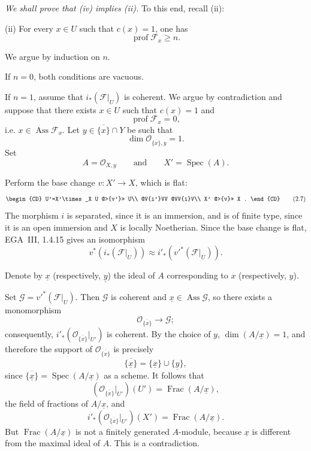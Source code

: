 \documentclass[11pt,a4paper,oneside]{book}
\providecommand{\cF}{\mathcal F}
\providecommand{\cG}{\mathcal G}
\providecommand{\cO}{\mathcal O}
\providecommand{\Ass}{\operatorname{Ass}}
\providecommand{\Spec}{\operatorname{Spec}}
\providecommand{\Frac}{\operatorname{Frac}}
\providecommand{\prof}{\operatorname{prof}}
\theoremstyle{plain}
\theoremstyle{definition}
\theoremstyle{remark}
\begin{document}
\medskip
\noindent\textit{We shall prove that \textup{(iv)} implies
\textup{(ii)}.} To this end, recall \textup{(ii)}:

\medskip
\noindent\textup{(ii)} For every $x\in U$ such that $c(x)=1$, one has
\[
  \operatorname{prof}\cF_x\geq n.
\]

\noindent We argue by induction on $n$.

\medskip
\noindent If $n=0$, both conditions are vacuous.


\medskip
\noindent If $n=1$, assume that $i_*(\cF|_U)$ is coherent. We argue by
contradiction and suppose that there exists $x\in U$ such that $c(x)=1$ and
\[
  \prof\cF_x=0,
\]
i.e. $x\in\Ass\cF_x$. Let $y\in\overline{\{x\}}\cap Y$ be such that
\[
  \dim\cO_{\overline{\{x\}},y}=1.
\]
Set
\[
  A=\cO_{X,y}\qquad\text{and}\qquad X'=\Spec(A).
\]

\setcounter{equation}{6}
\noindent Perform the base change $v\colon X'\longrightarrow X$, which is
flat:
\begin{equation}
\begin{CD}
U'=X'\times_X U @>{v'}>> U\\
@V{i'}VV @VV{i}V\\
X' @>{v}>> X .
\end{CD}
\tag{2.7}\label{eq:VIII.2.7}
\end{equation}
The morphism $i$ is separated, since it is an immersion, and is of finite
type, since it is an open immersion and $X$ is locally Noetherian. Since the
base change is flat, EGA~III, 1.4.15 gives an isomorphism
\begin{equation}
  v^*(i_*(\cF|_U))
  \approx
  i'_*(v'^*(\cF|_U)).
\tag{2.8}\label{eq:VIII.2.8}
\end{equation}

\quad Denote by
$\underline{x}$ (respectively, $\underline{y}$) the ideal of $A$
corresponding to $x$ (respectively, $y$).

\medskip
\noindent Set $\cG=v'^*(\cF|_U)$. Then $\cG$ is coherent and
$\underline{x}\in\Ass\cG$, so there exists a monomorphism
\[
  \cO_{\overline{\{x\}}}\longrightarrow\cG;
\]
consequently, $i'_*(\cO_{\overline{\{x\}}}|_{U'})$ is coherent. By the choice
of $y$, $\dim(A/\underline{x})=1$, and therefore the support of
$\cO_{\overline{\{x\}}}$ is precisely
\[
  \overline{\{\underline{x}\}}
  =\{\underline{x}\}\cup\{\underline{y}\},
\]
since $\overline{\{\underline{x}\}}=\Spec(A/\underline{x})$ as a scheme. It
follows that
\[
  (\cO_{\overline{\{x\}}}|_{U'})(U')
  =\Frac(A/\underline{x}),
\]
the field of fractions of $A/\underline{x}$, and
\[
  i'_*(\cO_{\overline{\{x\}}}|_{U'})(X')
  =\Frac(A/\underline{x}).
\]
But $\Frac(A/\underline{x})$ is not a finitely generated $A$-module, because
$\underline{x}$ is different from the maximal ideal of $A$. This is a
contradiction.
\end{document}
